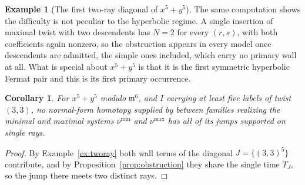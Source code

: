 \documentclass[11pt]{amsart}
\newtheorem{corollary}[theorem]{Corollary}
\theoremstyle{definition}
\newtheorem{example}[theorem]{Example}
\theoremstyle{remark}
\begin{document}
\begin{example}[The first two-ray diagonal of $x^5+y^5$]
The same computation shows the difficulty is not peculiar to the hyperbolic regime. A
single insertion of maximal twist with two descendents has $N=2$ for every $(r,s)$, with
both coefficients again nonzero, so the obstruction appears in every model once
descendents are admitted, the simple ones included, which carry no primary wall at
all. What is special about $x^{5}+y^{5}$ is that it is the first symmetric
hyperbolic Fermat pair and this is its first primary occurrence.
\end{example}

\begin{corollary}
\label{cor:nosimple}
For $x^{5}+y^{5}$ modulo $\mathfrak m^{6}$, and $I$ carrying at least five
labels of twist $(3,3)$, no normal-form homotopy supplied by
\cite[Lem.~3.40]{GKT} between families realizing the minimal and maximal
systems $\nu^{\min}$ and $\nu^{\max}$ has all of its jumps supported on single
rays.
\end{corollary}

\begin{proof}
By Example~\ref{ex:tworay} both wall terms of the diagonal $J=\{(3,3)^{5}\}$ contribute,
and by Proposition~\ref{prop:obstruction} they share the single time $T_{J}$, so the
jump there meets two distinct rays.
\end{proof}
\end{document}
